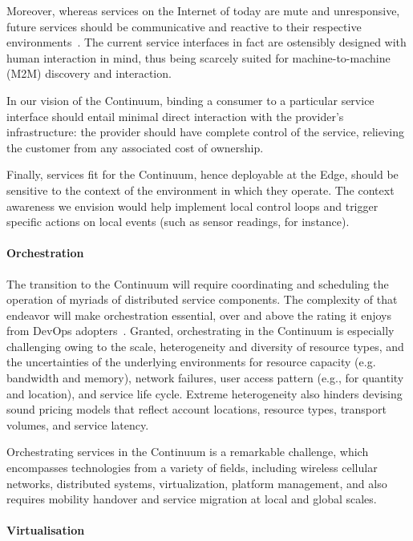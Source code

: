 Moreover, whereas services on the Internet of today are mute and unresponsive, future services should be communicative and reactive to their respective environments~\cite{haller2008internet}. 
The current service interfaces in fact are ostensibly designed with human interaction in mind, thus being scarcely suited for machine-to-machine (M2M) discovery and interaction. 

In our vision of the Continuum, binding a consumer to a particular service interface should entail minimal direct interaction with the provider's infrastructure: the provider should have complete control of the service, relieving the customer from any associated cost of ownership.

Finally, services fit for the Continuum, hence deployable at the Edge, should be sensitive to the context of the environment in which they operate.
The context awareness we envision would help implement local control loops and trigger specific actions on local events (such as sensor readings, for instance).

\paragraph{Orchestration}
The transition to the Continuum will require coordinating and scheduling the operation of myriads of distributed service components. The complexity of that endeavor will make orchestration essential, over and above the rating it enjoys from DevOps adopters~\cite{nygren2010akamai}. 
Granted, orchestrating in the Continuum is especially challenging owing to the scale, heterogeneity and diversity of resource types, and the uncertainties of the underlying environments for resource capacity (e.g. bandwidth and memory), network failures, user access pattern (e.g., for quantity and location), and service life cycle.
Extreme heterogeneity also hinders devising sound pricing models that reflect account locations, resource types, transport volumes, and service latency.

Orchestrating services in the Continuum is a remarkable challenge, which encompasses technologies from a variety of fields, including wireless cellular networks, distributed systems, virtualization, platform management, and also requires mobility handover and service migration at local and global scales.

\paragraph{Virtualisation}
\label{sec:virtualisation}

